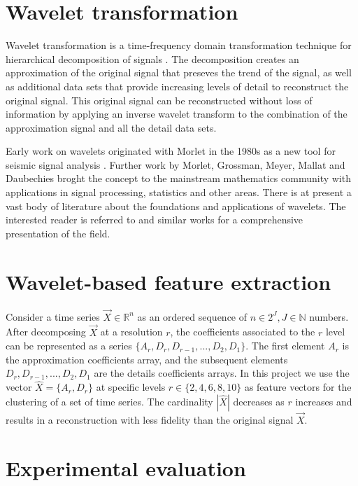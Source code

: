 \documentclass{article}
\begin{document}
\section{Wavelet transformation}

Wavelet transformation is a time-frequency domain transformation technique for hierarchical decomposition of signals \cite{C92,D92}. The decomposition creates an approximation of the original signal that preseves the trend of the signal, as well as additional data sets that provide increasing levels of detail to reconstruct the original signal. This original signal can be reconstructed without loss of information by applying an inverse wavelet transform to the combination of the approximation signal and all the detail data sets.

Early work on wavelets originated with Morlet in the 1980s as a new tool for seismic signal analysis \cite{MAFG82}. Further work by Morlet, Grossman, Meyer, Mallat and Daubechies \cite{CGT89,D88} broght the concept to the mainstream mathematics community with applications in signal processing, statistics and other areas. There is at present a vast body of literature about the foundations and applications of wavelets. The interested reader is referred to \cite{BGG98} and similar works for a comprehensive presentation of the field.


\section{Wavelet-based feature extraction}

Consider a time series $\overrightarrow{X} \in \mathbb{R}^n$ as an ordered sequence of $n \in 2^J, J \in \mathbb{N}$ numbers. After decomposing $\overrightarrow{X}$ at a resolution $r$, the coefficients associated to the $r$ level can be represented as a series $\{A_r,D_r,D_{r-1},...,D_2,D_1\}$. The first element $A_r$ is the approximation coefficients array, and the subsequent elements $D_r,D_{r-1},...,D_2,D_1$ are the details coefficients arrays. In this project we use the vector $\widehat{X} = \{A_r,D_r\}$ at specific levels $r \in \{2,4,6,8,10\}$ as feature vectors for the clustering of a set of time series. The cardinality $|\widehat{X}|$ decreases as $r$ increases and results in a reconstruction with less fidelity than the original signal $\overrightarrow{X}$. 


\section{Experimental evaluation}
\end{document}
